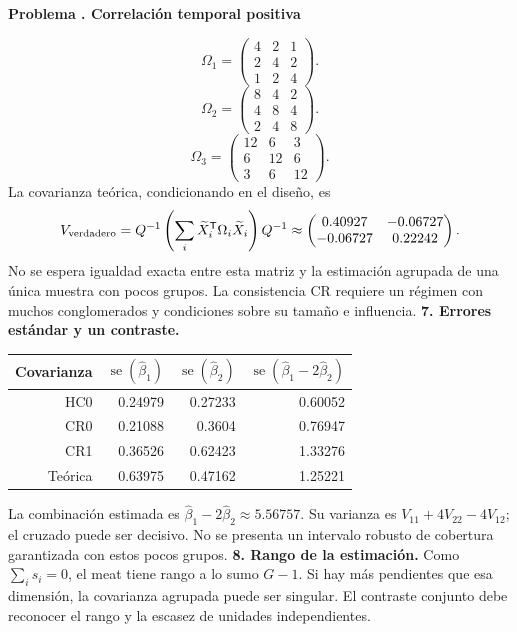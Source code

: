 \documentclass[11pt,a4paper]{article}
\newcommand{\T}{^{\mathsf T}}
\theoremstyle{definition}
\newcounter{problema}
\newenvironment{resuelto}[1]{\refstepcounter{problema}\par\medskip\Needspace{6\baselineskip}\textbf{Problema \theproblema. #1}\par}{\par\medskip}
\DeclareMathOperator{\se}{se}
\begin{document}
\begin{resuelto}{Correlación temporal positiva}
\[
\Omega_{1}=\begin{pmatrix}
4&2&1\\2&4&2\\1&2&4
\end{pmatrix}.
\]
\[
\Omega_{2}=\begin{pmatrix}
8&4&2\\4&8&4\\2&4&8
\end{pmatrix}.
\]
\[
\Omega_{3}=\begin{pmatrix}
12&6&3\\6&12&6\\3&6&12
\end{pmatrix}.
\]
La covarianza teórica, condicionando en el diseño, es
\[
V_{\rm verdadero}=Q^{-1}\left(\sum_i\widetilde X_i\T\Omega_i\widetilde X_i\right)Q^{-1}\approx\begin{pmatrix}
0.40927&-0.06727\\-0.06727&0.22242
\end{pmatrix}.
\]
No se espera igualdad exacta entre esta matriz y la estimación agrupada de una única muestra con pocos grupos. La consistencia CR requiere un régimen con muchos conglomerados y condiciones sobre su tamaño e influencia.
\textbf{7. Errores estándar y un contraste.}

\begin{center}\small
\begin{tabular}{rrrr}
\toprule
Covarianza&$\se(\widehat\beta_1)$&$\se(\widehat\beta_2)$&$\se(\widehat\beta_1-2\widehat\beta_2)$\\
\midrule
HC0&0.24979&0.27233&0.60052\\
CR0&0.21088&0.3604&0.76947\\
CR1&0.36526&0.62423&1.33276\\
Teórica&0.63975&0.47162&1.25221\\
\bottomrule
\end{tabular}
\end{center}
La combinación estimada es $\widehat\beta_1-2\widehat\beta_2\approx5.56757$. Su varianza es $V_{11}+4V_{22}-4V_{12}$; el cruzado puede ser decisivo. No se presenta un intervalo robusto de cobertura garantizada con estos pocos grupos.
\textbf{8. Rango de la estimación.} Como $\sum_i s_i=0$, el meat tiene rango a lo sumo $G-1$. Si hay más pendientes que esa dimensión, la covarianza agrupada puede ser singular. El contraste conjunto debe reconocer el rango y la escasez de unidades independientes.
\end{resuelto}
\end{document}
